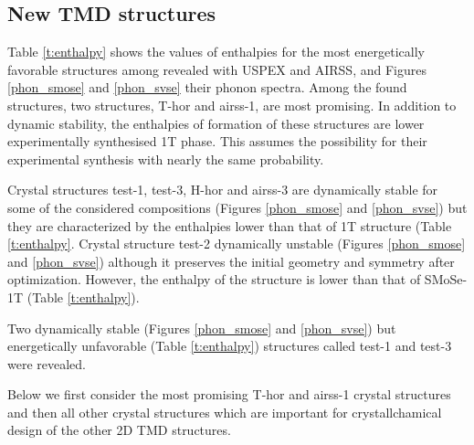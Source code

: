 \documentclass[a4paperm]{article}
\begin{document}
		\subsection{New TMD structures}

Table \ref{t:enthalpy} shows the values of enthalpies for the most energetically favorable structures among revealed with USPEX and AIRSS, and Figures \ref{phon_smose} and  \ref{phon_svse} their phonon spectra. 
Among the found structures, two structures, T-hor and airss-1, are most promising.
In addition to dynamic stability, the enthalpies of formation of these structures are lower experimentally synthesised 1T phase.
This assumes the possibility for their experimental synthesis with nearly the same probability.

Crystal structures test-1, test-3, H-hor and airss-3 are dynamically stable for some of the considered compositions (Figures \ref{phon_smose} and  \ref{phon_svse}) but they are characterized by the enthalpies lower than that of 1T structure (Table \ref{t:enthalpy}. 
Crystal structure test-2 dynamically unstable (Figures \ref{phon_smose} and \ref{phon_svse}) although it preserves the initial geometry and symmetry after optimization.
However, the enthalpy of the structure is lower than that of SMoSe-1T  (Table \ref{t:enthalpy}).

Two dynamically stable (Figures \ref{phon_smose} and  \ref{phon_svse}) but energetically unfavorable (Table \ref{t:enthalpy}) structures called test-1 and test-3 were revealed.

Below we first consider the most promising T-hor and airss-1 crystal structures and then all other crystal structures which are important for crystallchamical design of the other 2D TMD structures.
\end{document}
